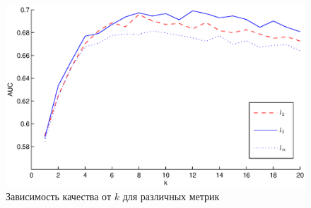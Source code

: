 \documentclass[8pt, a4paper]{article}
\begin{document}
\begin{figure}[h]
    \includegraphics[width=\textwidth]{metrics.eps}
    \caption{Зависимость качества от $k$ для различных метрик}
    \label{metrics}
\end{figure}
% 
%
%
%
%
%
% 
\end{document}
